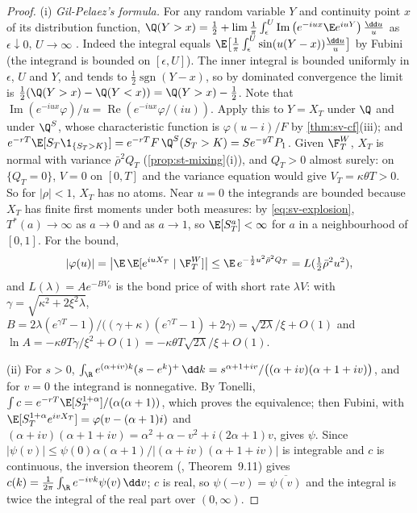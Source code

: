 \begin{proof}
(i) \emph{Gil-Pelaez's formula.} For any random variable $Y$ and continuity point $x$ of its distribution
function, $\Q(Y>x)=\frac12+\lim\frac1\pi\int_\epsilon^U\operatorname{Im}\big(e^{-iux}\E e^{iuY}\big)\,\frac{\dd u}u$ as
$\epsilon\downarrow0$, $U\to\infty$ \citep{gil-pelaez}. Indeed the integral equals
$\E\big[\frac1\pi\int_\epsilon^U\sin(u(Y-x))\frac{\dd u}u\big]$ by Fubini (the integrand is bounded on
$[\epsilon,U]$). The inner integral is bounded uniformly in $\epsilon$, $U$ and $Y$, and tends to
$\frac12\operatorname{sgn}(Y-x)$, so by dominated convergence the limit is
$\frac12(\Q(Y>x)-\Q(Y<x))=\Q(Y>x)-\frac12$. Note that
$\operatorname{Im}(e^{-iux}\varphi)/u=\operatorname{Re}(e^{-iux}\varphi/(iu))$. Apply this to $Y=X_T$ under $\Q$ and
under $\Q^S$, whose characteristic function is $\varphi(u-i)/F$ by \cref{thm:sv-cf}(iii); and
$e^{-rT}\E[S_T\1_{\{S_T>K\}}]=e^{-rT}F\,\Q^S(S_T>K)=Se^{-yT}P_1$. Given $\F^W_T$, $X_T$ is normal with variance
$\bar\rho^2Q_T$ (\cref{prop:st-mixing}(i)), and $Q_T>0$ almost surely: on $\{Q_T=0\}$, $V=0$ on $[0,T]$ and the
variance equation would give $V_T=\kappa\theta T>0$. So for $|\rho|<1$, $X_T$ has no atoms. Near $u=0$ the
integrands are bounded because $X_T$ has finite first moments under both measures: by \eqref{eq:sv-explosion},
$T^*(a)\to\infty$ as $a\to0$ and as $a\to1$, so $\E[S_T^a]<\infty$ for $a$ in a neighbourhood of $[0,1]$. For the bound,
\[
  |\varphi(u)|=\big|\E\,\E[e^{iuX_T}\mid\F^W_T]\big|\le\E\,e^{-\frac12u^2\bar\rho^2Q_T}=L(\tfrac12\bar\rho^2u^2),
\]
and $L(\lambda)=Ae^{-BV_0}$ is the bond price of \textcite{cox-ingersoll-ross} with short rate $\lambda V$: with
$\gamma=\sqrt{\kappa^2+2\xi^2\lambda}$, $B=2\lambda(e^{\gamma T}-1)/\big((\gamma+\kappa)(e^{\gamma T}-1)+2\gamma\big)
=\sqrt{2\lambda}/\xi+O(1)$ and $\ln A=-\kappa\theta T\gamma/\xi^2+O(1)=-\kappa\theta T\sqrt{2\lambda}/\xi+O(1)$.

(ii) For $s>0$, $\int_\R e^{(\alpha+iv)k}(s-e^k)^+\,\dd k=s^{\alpha+1+iv}/\big((\alpha+iv)(\alpha+1+iv)\big)$, and for
$v=0$ the integrand is nonnegative. By Tonelli, $\int c=e^{-rT}\E[S_T^{1+\alpha}]/(\alpha(\alpha+1))$, which proves the
equivalence; then Fubini, with $\E[S_T^{1+\alpha}e^{ivX_T}]=\varphi(v-(\alpha+1)i)$ and
$(\alpha+iv)(\alpha+1+iv)=\alpha^2+\alpha-v^2+i(2\alpha+1)v$, gives $\psi$. Since $|\psi(v)|\le\psi(0)\alpha(\alpha+1)/
|(\alpha+iv)(\alpha+1+iv)|$ is integrable and $c$ is continuous, the inversion theorem (\textcite{rudin-rca},
Theorem~9.11) gives $c(k)=\frac1{2\pi}\int_\R e^{-ivk}\psi(v)\,\dd v$; $c$ is real, so $\psi(-v)=\overline{\psi(v)}$
and the integral is twice the integral of the real part over $(0,\infty)$.


\end{proof}
